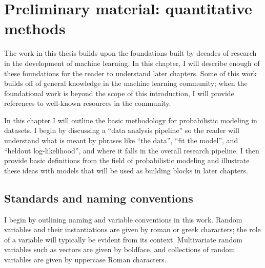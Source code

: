 \chapter{Preliminary material: quantitative methods}
\label{chapter:introductory_material}

The work in this thesis builds upon the foundations built by decades
of research in the development of machine learning.  In this chapter,
I will describe enough of these foundations for the reader to
understand later chapters. Some of this work builds off of general
knowledge in the machine learning community; when the foundational
work is beyond the scope of this introduction, I will provide
references to well-known resources in the community.

In this chapter I will outline the basic methodology for
probabilistic modeling in datasets.  I begin by discussing a ``data
analysis pipeline'' so the reader will understand what is meant by
phrases like ``the data'', ``fit the model'', and ``heldout
log-likelihood'', and where it falls in the overall research pipeline.
I then provide basic definitions from the field of probabilistic
modeling and illustrate these ideas with models that will be used as
building blocks in later chapters.

\section{Standards and naming conventions}
I begin by outlining naming and variable conventions in this work.
Random variables and their instantiations are given by roman or greek
characters; the role of a variable will typically be evident from its
context.  Multivariate random variables such as vectors are given by
boldface, and collections of random variables are given by uppercase
Roman characters.

